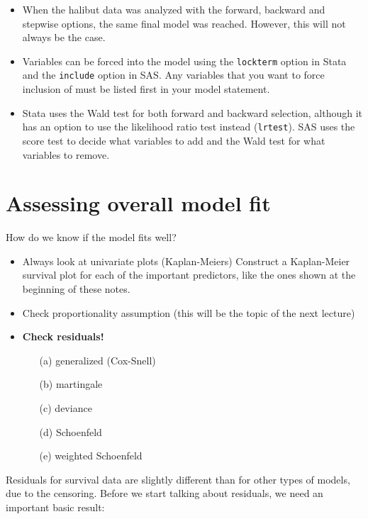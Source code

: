 \documentclass[11pt]{book}
\begin{document}
\normalsize
{}
\begin{itemize}
\item  When the halibut data was analyzed with the forward, backward and
stepwise options,  the same final model was reached.
However, this will not always be the case.
\item  Variables can be forced into the model using the {\tt lockterm}
option in Stata and the {\tt include} option in SAS.  Any variables
that you want to force inclusion of must be
listed first in your model statement.
\item  Stata uses the Wald test for both forward and backward
selection, although it has an option to use the likelihood ratio test
instead ({\tt lrtest}).  SAS uses the score test to decide what
variables to add and the Wald test for what variables
to remove.
\end{itemize}

\section{Assessing overall model fit}
How do we know if the model fits well?
\begin{itemize}
\item  Always look at univariate plots (Kaplan-Meiers)
Construct a Kaplan-Meier survival plot for each
of the important predictors, like the ones shown at the
beginning of these notes.
\item  Check proportionality assumption (this will be the topic of the
next lecture)
\item  {\bf Check residuals!}
\begin{itemize}
\item[(a)] generalized (Cox-Snell)
\item[(b)] martingale
\item[(c)] deviance
\item[(d)] Schoenfeld
\item[(e)] weighted Schoenfeld
\end{itemize}
\end{itemize}
Residuals for survival data are slightly different than for other
types of models, due to the censoring.  Before we start talking
about residuals, we need an important basic result:
\end{document}

